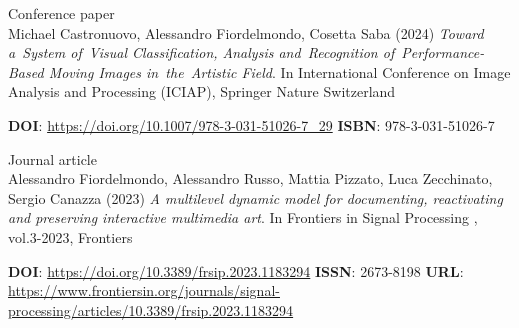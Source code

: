 \documentclass[7pt,a4paper]{article}
\begin{document}
\begin{mdframed}[
    backgroundcolor=white,
    linecolor=white,
    linewidth=0pt,
    innerleftmargin=6pt,
    innerrightmargin=6pt,
    innertopmargin=6pt,
    innerbottommargin=6pt,
    skipabove=0pt,
    skipbelow=0pt
]

\scriptsize Conference paper\\
\normalsize Michael Castronuovo, Alessandro Fiordelmondo, Cosetta Saba
(2024) \textit{Toward a System of Visual Classification, Analysis and Recognition of Performance-Based Moving Images in the Artistic Field}.
In
International Conference on Image Analysis and Processing (ICIAP), Springer Nature Switzerland

\vspace{0.1cm}
\scriptsize  \textbf{DOI}: \href{https://doi.org/10.1007/978-3-031-51026-7_29}{https://doi.org/10.1007/978-3-031-51026-7\_29}
\scriptsize  \textbf{ISBN}: 978-3-031-51026-7 
\scriptsize 
\scriptsize 
\vspace{0.15cm}
\end{mdframed}




\begin{mdframed}[
    backgroundcolor=entrygray,
    linecolor=entrygray,
    linewidth=0pt,
    innerleftmargin=6pt,
    innerrightmargin=6pt,
    innertopmargin=6pt,
    innerbottommargin=6pt,
    skipabove=0pt,
    skipbelow=0pt
]

\scriptsize Journal article\\
\normalsize Alessandro Fiordelmondo, Alessandro Russo, Mattia Pizzato, Luca Zecchinato, Sergio Canazza
(2023) \textit{A multilevel dynamic model for documenting, reactivating and preserving interactive multimedia art}.
In
 Frontiers in Signal Processing
, vol.3-2023, Frontiers

\vspace{0.1cm}
\scriptsize  \textbf{DOI}: \href{https://doi.org/10.3389/frsip.2023.1183294}{https://doi.org/10.3389/frsip.2023.1183294}
\scriptsize 
\scriptsize  \textbf{ISSN}: 2673-8198 
\scriptsize  \textbf{URL}: \href{https://www.frontiersin.org/journals/signal-processing/articles/10.3389/frsip.2023.1183294}{https://www.frontiersin.org/journals/signal-processing/articles/10.3389/frsip.2023.1183294}
\vspace{0.15cm}
\end{mdframed}
\end{document}
